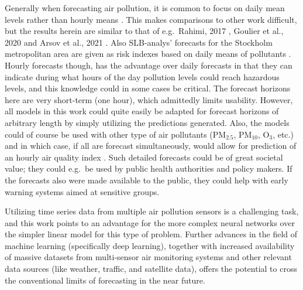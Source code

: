 Generally when forecasting air pollution, it is common to focus on daily mean levels rather than hourly means \cite{atmos7020015, Shams2021}. This makes comparisons to other work difficult, but the results herein are similar to that of e.g.\ Rahimi, 2017 \cite{Rahimi2017}, Goulier et al., 2020\cite{Goulier2020} and Arsov et al., 2021 \cite{Arsov2021}. Also SLB-analys' forecasts for the Stockholm metropolitan area are given as risk indexes based on daily means of pollutants \cite{slbanalys}. Hourly forecasts though, has the advantage over daily forecasts in that they can indicate during what hours of the day pollution levels could reach hazardous levels, and this knowledge could in some cases be critical. The forecast horizons here are very short-term (one hour), which admittedly limits usability. However, all models in this work could quite easily be adapted for forecast horizons of arbitrary length by simply utilizing the predictions generated. Also, the models could of course be used with other type of air pollutants (PM$_{2.5}$, PM$_{10}$, O$_3$, etc.) and in which case, if all are forecast simultaneously, would allow for prediction of an hourly air quality index \cite{VanLoon2010}. Such detailed forecasts could be of great societal value; they could e.g.\ be used by public health authorities and policy makers. If the forecasts also were made available to the public, they could help with early warning systems aimed at sensitive groups.

Utilizing time series data from multiple air pollution sensors is a challenging task, and this work points to an advantage for the more complex neural networks over the simpler linear model for this type of problem. 
%
Further advances in the field of machine learning (specifically deep learning), together with increased availability of massive datasets from multi-sensor air monitoring systems and other relevant data sources (like weather, traffic, and satellite data), offers the potential to cross the conventional limits of forecasting in the near future. 

